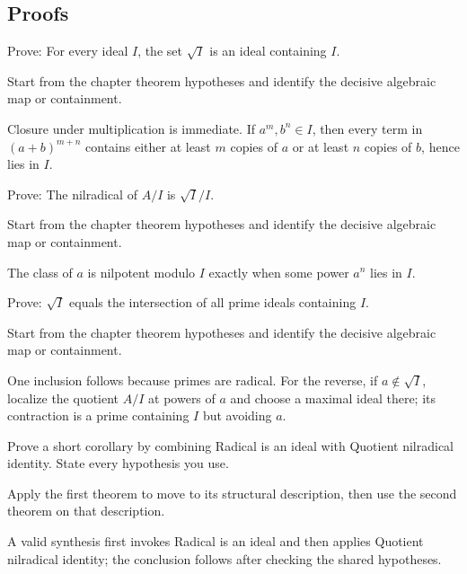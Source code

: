 \subsection*{Proofs}

\begin{exercise}\label{exr:v03-expand-06}
Prove: For every ideal $I$, the set $\sqrt I$ is an ideal containing $I$.
\end{exercise}
\begin{hint}
Start from the chapter theorem hypotheses and identify the decisive algebraic map or containment.
\end{hint}
\begin{solution}
Closure under multiplication is immediate. If $a^m,b^n\in I$, then every term in $(a+b)^{m+n}$ contains either at least $m$ copies of $a$ or at least $n$ copies of $b$, hence lies in $I$.
\end{solution}

\begin{exercise}\label{exr:v03-expand-07}
Prove: The nilradical of $A/I$ is $\sqrt I/I$.
\end{exercise}
\begin{hint}
Start from the chapter theorem hypotheses and identify the decisive algebraic map or containment.
\end{hint}
\begin{solution}
The class of $a$ is nilpotent modulo $I$ exactly when some power $a^n$ lies in $I$.
\end{solution}

\begin{exercise}\label{exr:v03-expand-08}
Prove: $\sqrt I$ equals the intersection of all prime ideals containing $I$.
\end{exercise}
\begin{hint}
Start from the chapter theorem hypotheses and identify the decisive algebraic map or containment.
\end{hint}
\begin{solution}
One inclusion follows because primes are radical. For the reverse, if $a\notin\sqrt I$, localize the quotient $A/I$ at powers of $a$ and choose a maximal ideal there; its contraction is a prime containing $I$ but avoiding $a$.
\end{solution}

\begin{exercise}\label{exr:v03-expand-09}
Prove a short corollary by combining Radical is an ideal with Quotient nilradical identity. State every hypothesis you use.
\end{exercise}
\begin{hint}
Apply the first theorem to move to its structural description, then use the second theorem on that description.
\end{hint}
\begin{solution}
A valid synthesis first invokes Radical is an ideal and then applies Quotient nilradical identity; the conclusion follows after checking the shared hypotheses.
\end{solution}

